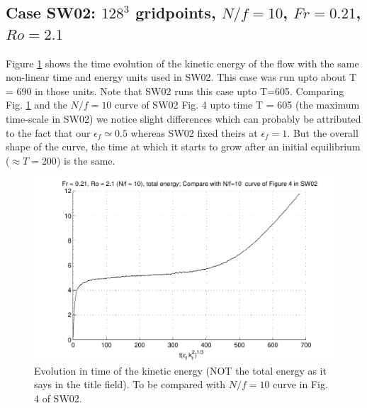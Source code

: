 \documentclass[12pt]{article}
\begin{document}
\subsection{Case SW02: $128^3$ gridpoints, $N/f = 10$, $Fr = 0.21$, $Ro = 2.1$}
Figure \ref{NF10_time} shows the time evolution of the kinetic energy
of the flow with the same non-linear time and energy units used in
SW02. This case was run upto about T = 690 in those units. Note that SW02
runs this case upto T=605. Comparing Fig. \ref{NF10_time} and the $N/f = 10$
curve of SW02 Fig. 4 upto time T = 605 (the maximum time-scale in
SW02) we notice slight differences which can probably be attributed to
the fact that our $\epsilon_f \simeq
0.5$ whereas SW02 fixed theirs at $\epsilon_f = 1$. But the overall
shape of the curve, the time at which it starts to grow after an
initial equilibrium ($\approx T = 200$) is the same.
\begin{figure}[ht]
\centering
  \includegraphics[scale = 0.5]{Comp_SW02_fig4_Nf10}
\caption{Evolution in time of the kinetic energy (NOT the total energy as it says in the title field). To be compared with $N/f = 10$ curve in Fig. 4 of SW02. \label{NF10_time}}
\end{figure}
\end{document}
